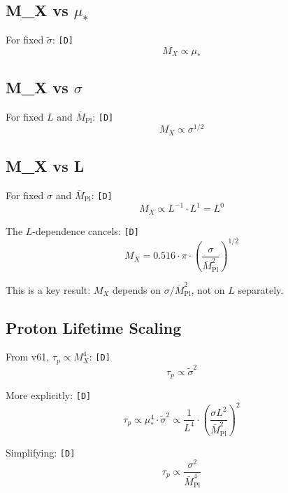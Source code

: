 \documentclass[11pt,a4paper]{article}
\newcommand{\tagD}{\textcolor{green!50!black}{\texttt{[D]}}}
\theoremstyle{definition}
\begin{document}
\subsection{M\_X vs $\mu_*$}
\label{app:mx-mustar-scaling}

For fixed $\tilde{\sigma}$: \tagD{}
\begin{equation}
\label{eq:mx-mustar-scaling}
M_X \propto \mu_*
\end{equation}

\subsection{M\_X vs $\sigma$}
\label{app:mx-sigma-scaling}

For fixed $L$ and $\bar{M}_{\text{Pl}}$: \tagD{}
\begin{equation}
\label{eq:mx-sigma-scaling}
M_X \propto \sigma^{1/2}
\end{equation}

\subsection{M\_X vs L}
\label{app:mx-l-scaling}

For fixed $\sigma$ and $\bar{M}_{\text{Pl}}$: \tagD{}
\begin{equation}
\label{eq:mx-l-scaling-combined}
M_X \propto L^{-1} \cdot L^{1} = L^0
\end{equation}

The $L$-dependence cancels: \tagD{}
\begin{equation}
\label{eq:mx-l-independent}
M_X = 0.516 \cdot \pi \cdot \left(\frac{\sigma}{\bar{M}_{\text{Pl}}^2}\right)^{1/2}
\end{equation}

This is a key result: $M_X$ depends on $\sigma/\bar{M}_{\text{Pl}}^2$, not on $L$ separately.

\subsection{Proton Lifetime Scaling}
\label{app:tau-scaling}

From v61, $\tau_p \propto M_X^4$: \tagD{}
\begin{equation}
\label{eq:tau-sigma-scaling}
\tau_p \propto \tilde{\sigma}^2
\end{equation}

More explicitly: \tagD{}
\begin{equation}
\label{eq:tau-explicit-scaling}
\tau_p \propto \mu_*^4 \cdot \tilde{\sigma}^2 \propto \frac{1}{L^4} \cdot \left(\frac{\sigma L^2}{\bar{M}_{\text{Pl}}^2}\right)^2
\end{equation}

Simplifying: \tagD{}
\begin{equation}
\label{eq:tau-final-scaling}
\tau_p \propto \frac{\sigma^2}{\bar{M}_{\text{Pl}}^4}
\end{equation}

\end{document}
